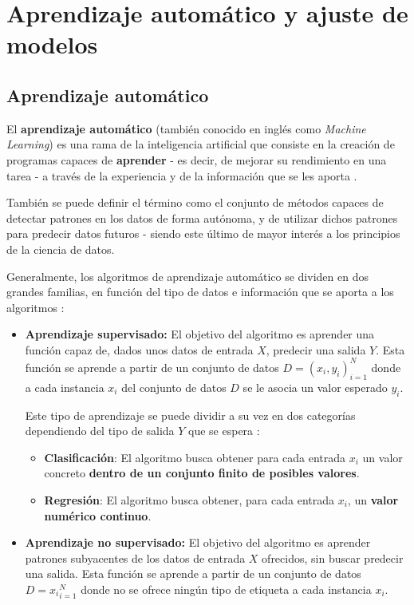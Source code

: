 \section{Aprendizaje automático y ajuste de modelos}

\subsection{Aprendizaje automático}

El \textbf{aprendizaje automático} (también conocido en inglés como \textit{Machine Learning}) es una rama de la inteligencia artificial que consiste en la creación de programas capaces de \textbf{aprender} - es decir, de mejorar su rendimiento en una tarea - a través de la experiencia y de la información que se les aporta \cite{mitchell1997machine}. 

También se puede definir el término como el conjunto de métodos capaces de detectar patrones en los datos de forma autónoma, y de utilizar dichos patrones para predecir datos futuros \cite{mlprobabilistic} - siendo este último de mayor interés a los principios de la ciencia de datos.

Generalmente, los algoritmos de aprendizaje automático se dividen en dos grandes familias, en función del tipo de datos e información que se aporta a los algoritmos \cite{aima, mlprobabilistic}:

\begin{itemize}[parsep=1pt, itemsep=1pt, topsep=4pt]
	\item \textbf{Aprendizaje supervisado:} El objetivo del algoritmo es aprender una función capaz de, dados unos datos de entrada $X$, predecir una salida $Y$. Esta función se aprende a partir de un conjunto de datos $D={(x_i, y_i)}^{N}_{i=1}$ donde a cada instancia $x_i$ del conjunto de datos $D$ se le asocia un valor esperado $y_i$.
	
	Este tipo de aprendizaje se puede dividir a su vez en dos categorías dependiendo del tipo de salida $Y$ que se espera \cite{aima}:
	\begin{itemize}[parsep=1pt, itemsep=1pt, topsep=4pt]
		\item \textbf{Clasificación}: El algoritmo busca obtener para cada entrada $x_i$ un valor concreto \textbf{dentro de un conjunto finito de posibles valores}.
		\item \textbf{Regresión}: El algoritmo busca obtener, para cada entrada $x_i$, un \textbf{valor numérico continuo}.
	\end{itemize}
	\item \textbf{Aprendizaje no supervisado:} El objetivo del algoritmo es aprender patrones subyacentes de los datos de entrada $X$ ofrecidos, sin buscar predecir una salida. Esta función se aprende a partir de un conjunto de datos $D={x_i}^{N}_{i=1}$ donde no se ofrece ningún tipo de etiqueta a cada instancia $x_i$.
\end{itemize}

